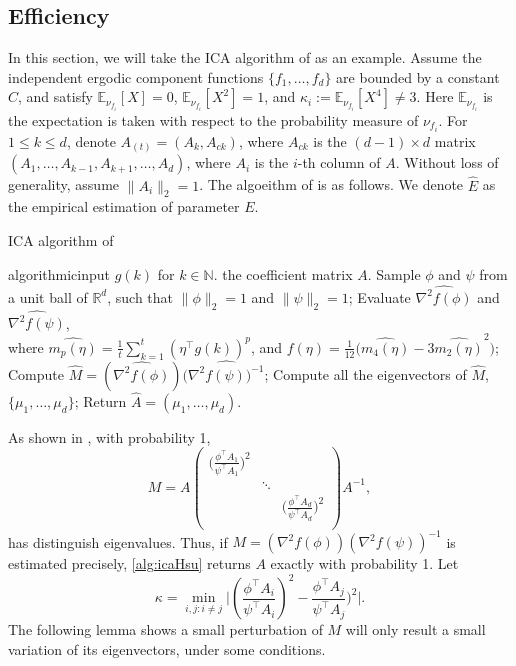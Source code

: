 \documentclass[english]{article} %
\newcommand{\E}{\mathbb{E}}
\newcommand{\real}{\mathbb{R}}
\renewcommand{\natural}{\mathbb{N}}
\theoremstyle{definition}
\begin{document}
\subsection{Efficiency}
In this section, we will take the ICA algorithm of \citet{DHsu2012} as an example. 
Assume the independent ergodic component functions $\{f_1,\ldots,f_d\}$ are bounded by a constant $C$, and satisfy $\E_{\nu_{f_i}}[X]=0$, $\E_{\nu_{f_i}}[X^2]=1$, and $\kappa_i := \E_{\nu_{f_i}}[X^4]\neq 3$. 
Here $\E_{\nu_{f_i}}$ is the expectation is taken with respect to the probability measure of $\nu_{f_i}$. 
For $1\le k\le d$, denote $A_{(t)} = (A_k,A_{ck})$, where $A_{ck}$ is the $(d-1)\times d$ matrix $(A_1,\ldots,A_{k-1},A_{k+1},\ldots,A_d)$, where $A_i$ is the $i$-th column of $A$. 
Without loss of generality, assume $\|A_i\|_2=1$.
The algoeithm of \citet{DHsu2012} is as follows. We denote $\widehat{E}$ as the empirical estimation of parameter $E$. 
\begin{algorithm}[H]
\caption{ICA algorithm of \citet{DHsu2012} \label{alg:icaHsu}}
\begin{algorithmic}[1]
\INPUT algorithmicinput $g(k)$ for $k\in\natural$.
\OUTPUT the coefficient matrix $A$. 
\STATE Sample $\phi$ and $\psi$ from a unit ball of $\real^d$, such that $\|\phi\|_2 = 1$ and $\|\psi\|_2 = 1$;
\STATE Evaluate $\widehat{\nabla^2f(\phi)}$ and $\widehat{\nabla^2f(\psi)}$, \\
\quad where $\widehat{m_p(\eta)} = \frac{1}{t}\sum_{k=1}^{t} (\eta^{\top}g(k))^p$, and $f(\eta) = \frac{1}{12}\big(\widehat{m_4(\eta)} - 3\widehat{m_2(\eta)}^2 \big)$;
\STATE Compute $\widehat{M} = (\widehat{\nabla^2f(\phi)})(\widehat{\nabla^2f(\psi))^{-1}}$;
\STATE Compute all the eigenvectors of $\widehat{M}$, $\{\mu_1,\ldots,\mu_d\}$;
\STATE Return $\widehat{A} = (\mu_1,\ldots,\mu_d)$.
\end{algorithmic}
\end{algorithm}

As shown in \citep{DHsu2012}, with probability 1,
\begin{equation}
\label{eq:M}
M = A 
\left(
\begin{array}{ccc}
\big(\frac{\phi^{\top}A_1}{\psi^{\top}A_1}\big)^2 & &\\
    & \ddots & \\
    & & \big(\frac{\phi^{\top}A_d}{\psi^{\top}A_d}\big)^2\\
\end{array} 
\right) 
A^{-1},
\end{equation}
has distinguish eigenvalues. Thus, if $M =(\nabla^2f(\phi))(\nabla^2f(\psi))^{-1} $ is estimated precisely, \cref{alg:icaHsu} returns $A$ exactly  with probability 1. 
Let 
\begin{equation}
\label{def:kappa}
\kappa =  \min_{i,j: i\neq j} \vert (\frac{\phi^{\top}A_i}{\psi^{\top}A_i})^2 - \frac{\phi^{\top}A_j}{\psi^{\top}A_j})^2 \vert. 
\end{equation}
The following lemma shows a small perturbation of $M$ will only result a small variation of its eigenvectors, under some conditions.
\end{document}
